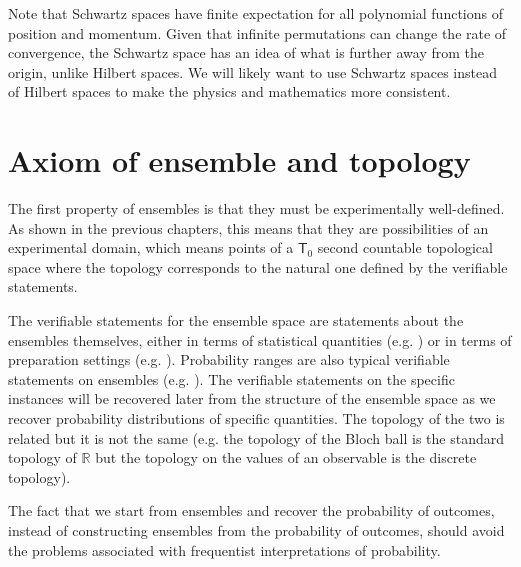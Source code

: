Note that Schwartz spaces have finite expectation for all polynomial functions of position and momentum. Given that infinite permutations can change the rate of convergence, the Schwartz space has an idea of what is further away from the origin, unlike Hilbert spaces. We will likely want to use Schwartz spaces instead of Hilbert spaces to make the physics and mathematics more consistent.

\section{Axiom of ensemble and topology}

The first property of ensembles is that they must be experimentally well-defined. As shown in the previous chapters, this means that they are possibilities of an experimental domain, which means points of a $\textsf{T}_0$ second countable topological space where the topology corresponds to the natural one defined by the verifiable statements.

The verifiable statements for the ensemble space are statements about the ensembles themselves, either in terms of statistical quantities (e.g. ) or in terms of preparation settings (e.g. ). Probability ranges are also typical verifiable statements on ensembles (e.g. ). The verifiable statements on the specific instances will be recovered later from the structure of the ensemble space as we recover probability distributions of specific quantities. The topology of the two is related but it is not the same (e.g. the topology of the Bloch ball is the standard topology of $\mathbb{R}$ but the topology on the values of an observable is the discrete topology).

The fact that we start from ensembles and recover the probability of outcomes, instead of constructing ensembles from the probability of outcomes, should avoid the problems associated with frequentist interpretations of probability.

